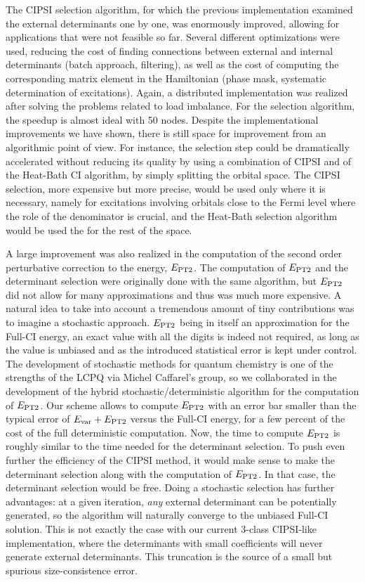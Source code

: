 \documentclass[12pt,a4paper]{report}
\begin{document}
The CIPSI selection algorithm, for which the previous implementation examined the external determinants one by one, was enormously improved, allowing for applications that were not feasible so far.\cite{Scemama_2018,1806.05115} Several different optimizations were used, reducing the cost of finding connections between external and internal determinants (batch approach, filtering), as well as the cost of computing the corresponding matrix element in the Hamiltonian (phase mask, systematic determination of excitations). Again, a distributed implementation was realized after 
solving the problems related to load imbalance. For the selection algorithm, the speedup is almost ideal with 50 nodes. Despite the implementational improvements we have shown, there is still space for improvement from an algorithmic point of view. For instance, the selection step could be dramatically accelerated without reducing its quality by using a combination of CIPSI and of the Heat-Bath CI algorithm\cite{Holmes_2016_2}, by simply splitting the orbital space. The CIPSI selection, more expensive but more precise, would be used only where it is necessary, namely for excitations involving orbitals close to the Fermi level where the role of the denominator is crucial, and the Heat-Bath selection algorithm would be used the for the rest of the space.

A large improvement was also realized in the computation of the second order
perturbative correction to the energy, $E_\text{PT2}$. The computation of
$E_\text{PT2}$ and the determinant selection were originally done with the same algorithm,
but $E_\text{PT2}$ did not allow for many
approximations and thus was much more expensive. A natural idea to take into account
a tremendous amount of tiny contributions was to imagine a stochastic approach.
$E_\text{PT2}$ being in itself an approximation for the Full-CI energy,
an exact value with all the digits is indeed not required, as long as the
value is unbiased and as the introduced statistical error is kept under control.
The development of
stochastic methods for quantum chemistry is one of the strengths of the LCPQ
via Michel Caffarel's group, so we collaborated in the development of the
hybrid stochastic/deterministic algorithm for the computation of $E_\text{PT2}$.  Our
scheme allows to compute $E_\text{PT2}$ with an error bar smaller than the typical
error of $E_{\text{var}} + E_\text{PT2}$ versus the Full-CI energy, for a few percent
of the cost of the full deterministic computation.  Now, the time to compute
$E_\text{PT2}$ is roughly similar to the time needed for the determinant selection.  To
push even further the efficiency of the CIPSI method, it would make sense to
make the determinant selection along with the computation of $E_\text{PT2}$. In that
case, the determinant selection would be free.  Doing a stochastic selection
has further advantages: at a given iteration, \emph{any} external determinant
can be potentially generated, so the algorithm will naturally converge to the
unbiased Full-CI solution. This is not exactly the case with our current 3-class CIPSI-like
implementation, where the determinants with small coefficients will never
generate external determinants. This truncation is the source of a small but
spurious size-consistence error.
\end{document}
